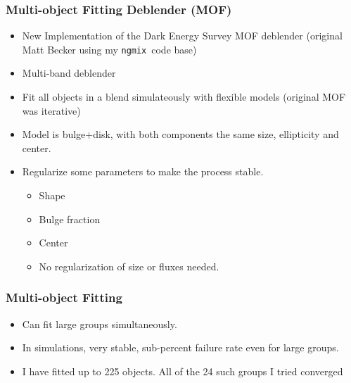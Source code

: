 \documentclass{beamer}
\newcommand{\ngmix}{\texttt{ngmix}}
\begin{document}
\frame
{
    \frametitle{Multi-object Fitting Deblender (MOF)}

    \begin{itemize}

        \item New Implementation of the Dark Energy Survey MOF deblender
            (original Matt Becker using my \ngmix\ code base)

        \item Multi-band deblender

        \item Fit all objects in a blend simulateously
            with flexible models (original MOF was iterative)

        \item Model is bulge+disk, with both components
            the same size, ellipticity and center.

        \item Regularize some parameters to make the process stable.
            \begin{itemize}
                \item Shape
                \item Bulge fraction
                \item Center
                \item No regularization of size or fluxes needed.
            \end{itemize}

    \end{itemize}

}

\frame
{
    \frametitle{Multi-object Fitting}

    \begin{itemize}
            
        \item Can fit large groups simultaneously.

        \item In simulations, very stable, sub-percent failure rate even for
            large groups.

        \item I have fitted up to 225 objects. All of the 24 such groups I
            tried converged

    \end{itemize}

}
\end{document}
